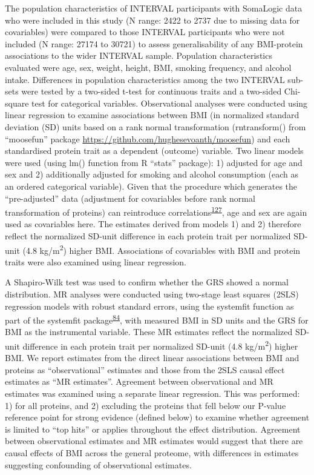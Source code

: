 \documentclass[11pt,twoside]{bristolthesis}
\begin{document}
The population characteristics of INTERVAL participants with SomaLogic data who were included in this study (N range: 2422 to 2737 due to missing data for covariables) were compared to those INTERVAL participants who were not included (N range: 27174 to 30721) to assess generalisability of any BMI-protein associations to the wider INTERVAL sample. Population characteristics evaluated were age, sex, weight, height, BMI, smoking frequency, and alcohol intake. Differences in population characteristics among the two INTERVAL sub-sets were tested by a two-sided t-test for continuous traits and a two-sided Chi-square test for categorical variables. Observational analyses were conducted using linear regression to examine associations between BMI (in normalized standard deviation (SD) units based on a rank normal transformation (rntransform() from ``moosefun'' package \url{https://github.com/hughesevoanth/moosefun}) and each standardised protein trait as a dependent (outcome) variable. Two linear models were used (using lm() function from R ``stats'' package): 1) adjusted for age and sex and 2) additionally adjusted for smoking and alcohol consumption (each as an ordered categorical variable). Given that the procedure which generates the ``pre-adjusted'' data (adjustment for covariables before rank normal transformation of proteins) can reintroduce correlations\textsuperscript{\protect\hyperlink{ref-Pain2018}{127}}, age and sex are again used as covariables here. The estimates derived from models 1) and 2) therefore reflect the normalized SD-unit difference in each protein trait per normalized SD-unit (4.8 kg/m\textsuperscript{2}) higher BMI. Associations of covariables with BMI and protein traits were also examined using linear regression.

A Shapiro-Wilk test was used to confirm whether the GRS showed a normal distribution. MR analyses were conducted using two-stage least squares (2SLS) regression models with robust standard errors, using the systemfit function as part of the systemfit package\textsuperscript{\protect\hyperlink{ref-Henningsen2007}{84}}, with measured BMI in SD units and the GRS for BMI as the instrumental variable. These MR estimates reflect the normalized SD-unit difference in each protein trait per normalized SD-unit (4.8 kg/m\textsuperscript{2}) higher BMI. We report estimates from the direct linear associations between BMI and proteins as ``observational'' estimates and those from the 2SLS causal effect estimates as ``MR estimates''. Agreement between observational and MR estimates was examined using a separate linear regression. This was performed: 1) for all proteins, and 2) excluding the proteins that fell below our P-value reference point for strong evidence (defined below) to examine whether agreement is limited to ``top hits'' or applies throughout the effect distribution. Agreement between observational estimates and MR estimates would suggest that there are causal effects of BMI across the general proteome, with differences in estimates suggesting confounding of observational estimates.
\end{document}
